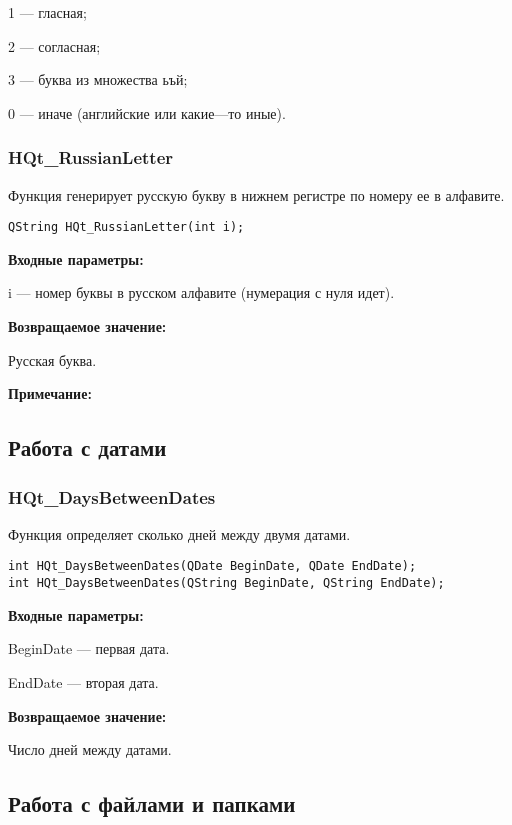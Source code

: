 \documentclass[a4paper,12pt]{article}
\begin{document}
    1 --- гласная;
 
    2 --- согласная;
 
    3 --- буква из множества ьъй;
 
    0 --- иначе (английские или какие---то иные).


\subsubsection{HQt\_RussianLetter}\label{HQt_RussianLetter}

Функция генерирует русскую букву в нижнем регистре по номеру ее в алфавите.


\begin{lstlisting}[label=code_syntax_HQt_RussianLetter,caption=Синтаксис]
QString HQt_RussianLetter(int i);
\end{lstlisting}

\textbf{Входные параметры:}

i --- номер буквы в русском алфавите (нумерация с нуля идет).

\textbf{Возвращаемое значение:}

Русская буква.

\textbf{Примечание:}


\subsection{Работа с датами}

\subsubsection{HQt\_DaysBetweenDates}\label{HQt_DaysBetweenDates}

Функция определяет сколько дней между двумя датами.


\begin{lstlisting}[label=code_syntax_HQt_DaysBetweenDates,caption=Синтаксис]
int HQt_DaysBetweenDates(QDate BeginDate, QDate EndDate);
int HQt_DaysBetweenDates(QString BeginDate, QString EndDate);
\end{lstlisting}

\textbf{Входные параметры:}

BeginDate --- первая дата.

EndDate --- вторая дата.

\textbf{Возвращаемое значение:}

Число дней между датами.


\subsection{Работа с файлами и папками}
\end{document}
